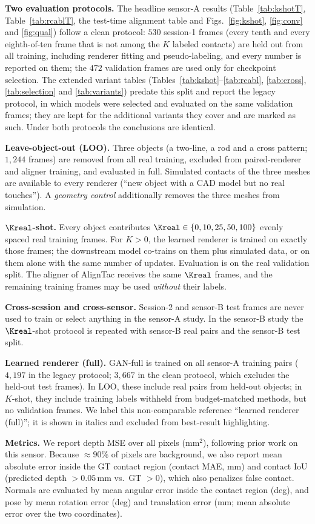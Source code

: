 \noindent\textbf{Two evaluation protocols.} The headline sensor-A results (Table~\ref{tab:kshotT}, Table~\ref{tab:rcablT}, the test-time alignment table and Figs.~\ref{fig:kshot}, \ref{fig:conv} and \ref{fig:qual}) follow a clean protocol: $530$ session-1 frames (every tenth and every eighth-of-ten frame that is not among the $K$ labeled contacts) are held out from all training, including renderer fitting and pseudo-labeling, and every number is reported on them; the $472$ validation frames are used only for checkpoint selection. The extended variant tables (Tables~\ref{tab:kshot}--\ref{tab:rcabl}, \ref{tab:cross}, \ref{tab:selection} and \ref{tab:variants}) predate this split and report the legacy protocol, in which models were selected and evaluated on the same validation frames; they are kept for the additional variants they cover and are marked as such. Under both protocols the conclusions are identical.

\noindent\textbf{Leave-object-out (LOO).} Three objects (a two-line, a rod and a cross pattern; $1{,}244$ frames) are removed from all real training, excluded from paired-renderer and aligner training, and evaluated in full. Simulated contacts of the three meshes are available to every renderer (``new object with a CAD model but no real touches''). A \emph{geometry control} additionally removes the three meshes from simulation.

\noindent\textbf{$\Kreal$-shot.} Every object contributes $\Kreal\in\{0,10,25,50,100\}$ evenly spaced real training frames. For $K>0$, the learned renderer is trained on exactly those frames; the downstream model co-trains on them plus simulated data, or on them alone with the same number of updates. Evaluation is on the real validation split. The aligner of AlignTac receives the same $\Kreal$ frames, and the remaining training frames may be used \emph{without} their labels.

\noindent\textbf{Cross-session and cross-sensor.} Session-2 and sensor-B test frames are never used to train or select anything in the sensor-A study. In the sensor-B study the $\Kreal$-shot protocol is repeated with sensor-B real pairs and the sensor-B test split.

\noindent\textbf{Learned renderer (full).} GAN-full is trained on all sensor-A training pairs ($4{,}197$ in the legacy protocol; $3{,}667$ in the clean protocol, which excludes the held-out test frames). In LOO, these include real pairs from held-out objects; in $K$-shot, they include training labels withheld from budget-matched methods, but no validation frames. We label this non-comparable reference ``learned renderer (full)''; it is shown in italics and excluded from best-result highlighting.

\noindent\textbf{Metrics.} We report depth MSE over all pixels ($\mathrm{mm}^2$), following prior work on this sensor. Because $\approx90\%$ of pixels are background, we also report mean absolute error inside the GT contact region (contact MAE, mm) and contact IoU (predicted depth $>0.05\,$mm vs.\ GT $>0$), which also penalizes false contact. Normals are evaluated by mean angular error inside the contact region (deg), and pose by mean rotation error (deg) and translation error (mm; mean absolute error over the two coordinates).
